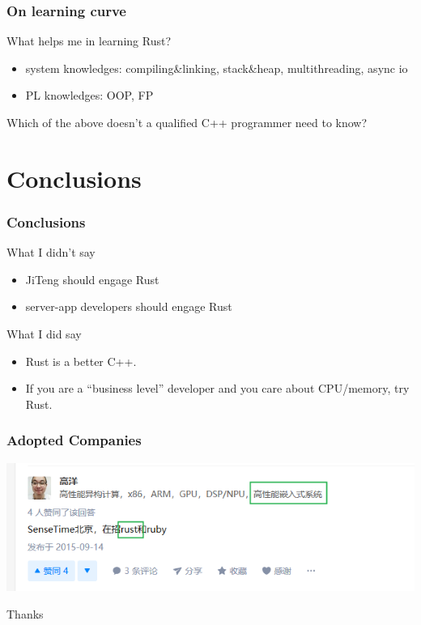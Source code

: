 \documentclass[lualatex,utf8]{beamer}
\begin{document}
\begin{frame}
  \frametitle{On learning curve}
  \begin{block}{What helps me in learning Rust?}
    \begin{itemize}
    \item system knowledges: compiling\&linking, stack\&heap, multithreading, async io
    \item PL knowledges: OOP, FP
    \end{itemize}
    Which of the above doesn't a qualified C++ programmer need to know?
  \end{block}
\end{frame}

\section{Conclusions}

\begin{frame}
  \frametitle{Conclusions}
  \begin{block}{What I didn't say}
    \begin{itemize}
    \item JiTeng should engage Rust
    \item server-app developers should engage Rust
    \end{itemize}
  \end{block}
  \begin{block}{What I did say}
    \begin{itemize}
    \item Rust is a better C++.
    \item If you are a ``business level'' developer and you care about CPU/memory, try Rust.
    \end{itemize}
  \end{block}
\end{frame}

\begin{frame}
  \frametitle{Adopted Companies}
  \noindent
  \includegraphics[width=\textwidth]{fig/sensetime.png}
\end{frame}

\begin{frame}
  \begin{center}
    \Huge
    Thanks
  \end{center}
\end{frame}
\end{document}
